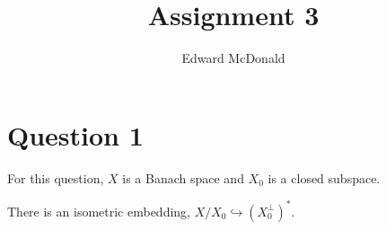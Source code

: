 \documentclass{unswmaths}
\begin{document}
\subject{Functional Analysis}
\author{Edward McDonald}
\title{Assignment 3}


\newcommand{\Real}{\operatorname{Re}}
\newcommand{\Img}{\operatorname{Im}}
\newcommand{\lan}{\langle}
\newcommand{\ran}{\rangle}
\newcommand{\Proj}{\mathbb{P}_+}
\newcommand{\isom}{\cong}
\newcommand{\id}{{\operatorname{id}}}


\unswtitle{}
\section*{Question 1}
For this question, $X$ is a Banach space and $X_0$ is a closed subspace.

\begin{proposition}
    There is an isometric embedding, $X/X_0 \hookrightarrow (X_0^\perp)^*$.
\end{proposition}
\end{document}
